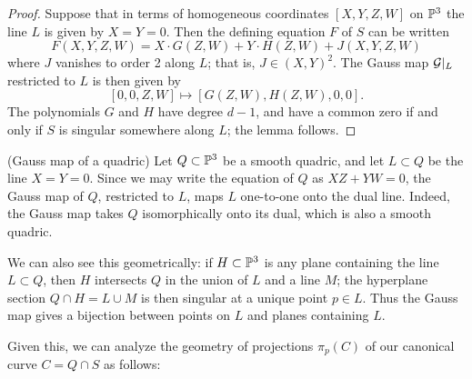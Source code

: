 \begin{proof}
Suppose that in terms of homogeneous coordinates $[X,Y,Z,W]$ on ${\mathbb P}^3$ the line $L$ is given by $X = Y = 0$. Then the defining equation $F$ of $S$ can be written
$$
F(X,Y,Z,W) = X\cdot G(Z,W) + Y\cdot H(Z,W) + J(X,Y,Z,W)
$$
where $J$ vanishes to order 2 along $L$; that is, $J \in (X,Y)^2$. The Gauss map ${\mathcal G}|_L$ restricted to $L$ is then given by
$$
[0,0,Z,W] \mapsto [G(Z,W), H(Z,W), 0, 0].
$$
The polynomials $G$ and $H$ have degree $d-1$, and have a common zero if and only if $S$ is singular somewhere along $L$; the lemma follows.
\end{proof}

\begin{example} (Gauss map of a quadric)
 Let $Q\subset {\mathbb P}^3$ be a smooth quadric, and let $L\subset Q$ be the line $X=Y =0$. Since we may write the equation of $Q$ as $XZ+YW = 0$, the Gauss map of $Q$, restricted to $L$, maps $L$ one-to-one onto the dual line. Indeed, the Gauss map takes $Q$ isomorphically onto its dual, which is also a smooth quadric.
 
 We can also see this geometrically: if $H \subset {\mathbb P}^3$ is any plane containing the line $L \subset Q$, then $H$ intersects $Q$ in the union of $L$ and a line $M$; the hyperplane section $Q \cap H = L \cup M$ is then singular at a unique point $p \in L$. Thus the Gauss map gives a bijection between points on $L$ and planes containing $L$. 
\end{example}

Given this, we can analyze the geometry of projections $\pi_p(C)$ of our canonical curve $C = Q \cap S$ as follows:

